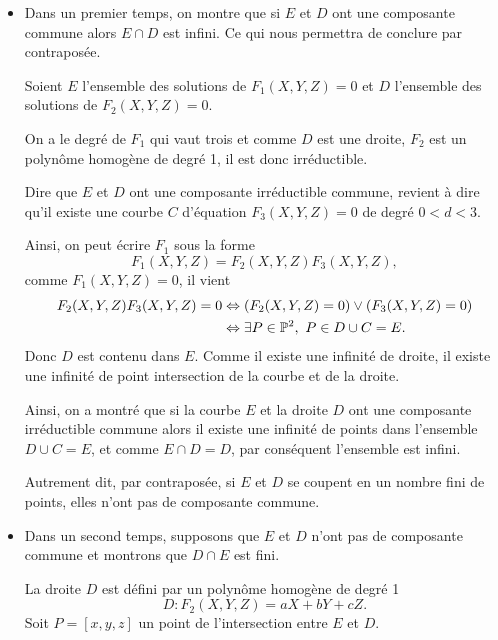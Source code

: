 \begin{demonstration}
    \begin{itemize}
        \item 
    Dans un premier temps, on montre que si $E$ et $D$ ont une composante commune alors $E
    \cap D$ est infini. Ce qui nous permettra de conclure par contraposée.

    Soient $E$ l'ensemble des solutions de $F_1(X,Y,Z) = 0$ et $D$ l'ensemble des solutions de
    $F_2(X,Y,Z) = 0$. 

    On a le degré de $F_1$ qui vaut trois et comme $D$ est une droite, $F_2$ est un polynôme
    homogène de degré 1, il est donc irréductible. 

    Dire que $E$ et $D$ ont une composante irréductible commune, revient à dire
    qu'il existe une courbe $C$ d'équation $F_3(X,Y,Z) = 0$ de degré $0<d<3$.

    Ainsi, on peut écrire $F_1$ sous la forme
    \[
    F_1(X,Y,Z) = F_2(X,Y,Z)F_3(X,Y,Z)
    ,\] 
    comme $F_1(X,Y,Z) = 0$, il vient 
    \begin{align*}
        F_2(X,Y,Z)F_3(X,Y,Z) = 0 & \iff \left( F_2(X,Y,Z)=0 \right)  \ou \left( F_3(X,Y,Z) = 0 \right)  \\
                                 & \iff \exists P \in \mathbb{P}^2,\ P \in D \cup C = E 
    .\end{align*}
    Donc $D$ est contenu dans $E$. Comme il existe une infinité de droite, il existe une
    infinité de point intersection de la courbe et de la droite.

    Ainsi, on a montré que  si la courbe $E$ et la droite $D$ ont une composante irréductible
    commune alors il existe une infinité de points dans l'ensemble $D \cup C = E$, et
    comme $E \cap D = D$, par conséquent l'ensemble est infini.

    Autrement dit, par contraposée, si $E$ et $D$ se coupent en un nombre fini de points, elles n'ont pas
    de composante commune.

    \item Dans un second temps, supposons que $E$ et $D$ n'ont pas de composante commune et montrons
    que $D \cap E$ est fini.

    La droite $D$ est défini par un polynôme homogène de degré 1
    \[
    D : F_2(X,Y,Z) = aX + bY + cZ
    .\] 
    Soit $P=[x,y,z]$ un point de l'intersection entre $E$ et $D$.



\end{itemize}
\end{demonstration}
